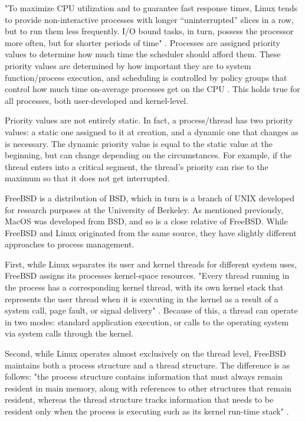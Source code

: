 \documentclass[10pt,draftclsnofoot,onecolumn]{IEEEtran}
\begin{document}
    "To maximize CPU utilization and to guarantee fast response times, Linux tends to provide non-interactive processes with longer “uninterrupted” slices in a row, but to run them less frequently. I/O bound tasks, in turn, possess the processor more often, but for shorter periods of time" \cite{Ishkov_2015}. Processes are assigned priority values to determine how much time the scheduler should afford them. These priority values are determined by how important they are to system function/process execution, and scheduling is controlled by policy groups that control how much time on-average processes get on the CPU \cite{Ishkov_2015}. This holds true for all processes, both user-developed and kernel-level.\par
    Priority values are not entirely static. In fact, a process/thread has two priority values: a static one assigned to it at creation, and a dynamic one that changes as is necessary. The dynamic priority value is equal to the static value at the beginning, but can change depending on the circumstances. For example, if the thread enters into a critical segment, the thread's priority can rise to the maximum so that it does not get interrupted.\par
    FreeBSD is a distribution of BSD, which in turn is a branch of UNIX developed for research purposes at the University of Berkeley. As mentioned previously, MacOS was developed from BSD, and so is a close relative of FreeBSD. While FreeBSD and Linux originated from the same source, they have slightly different approaches to process management.\par
    First, while Linux separates its user and kernel threads for different system uses, FreeBSD assigns its processes kernel-space resources. "Every thread running in the process has a corresponding kernel thread, with its own kernel stack that represents the user thread when it is executing in the kernel as a result of a system call, page fault, or signal delivery" \cite{mckusick_neville-neil_watson_mckusick_2015}. Because of this, a thread can operate in two modes: standard application execution, or calls to the operating system via system calls through the kernel.\par
    Second, while Linux operates almost exclusively on the thread level, FreeBSD maintains both a process structure and a thread structure. The difference is as follows: "the process structure contains information that must always remain resident in main memory, along with references to other structures that remain resident, whereas the thread structure tracks information that needs to be resident only when the process is executing such as its kernel run-time stack" \cite{mckusick_neville-neil_watson_mckusick_2015}.\par
\end{document}
